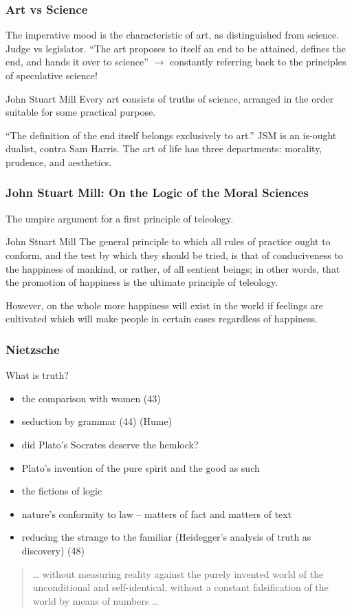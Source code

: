 \documentclass[xcolor=dvipsnames]{beamer}
\begin{document}
\begin{frame}
  \frametitle{Art vs Science}
  The imperative mood is the characteristic of art, as distinguished
  from science. Judge vs legislator. ``The art proposes to itself an
  end to be attained, defines the end, and hands it over to science''
  $\longrightarrow$ constantly referring back to the principles of
  speculative science!
  \begin{block}{John Stuart Mill}
    Every art consists of truths of science, arranged in the order
    suitable for some practical purpose.
  \end{block}
``The definition of the end itself belongs exclusively to art.'' JSM
is an is-ought dualist, contra Sam Harris. The art of life has three
departments: morality, prudence, and aesthetics.
\end{frame}

\begin{frame}
  \frametitle{John Stuart Mill: On the Logic of the Moral Sciences}
  The umpire argument for a first principle of teleology.
  \begin{block}{John Stuart Mill}
    The general principle to which all rules of practice ought to
    conform, and the test by which they should be tried, is that of
    conduciveness to the happiness of mankind, or rather, of all
    sentient beings; in other words, that the promotion of happiness
    is the ultimate principle of teleology.
  \end{block}
However, on the whole more happiness will exist in the world if
feelings are cultivated which will make people in certain cases
regardless of happiness.
\end{frame}

\begin{frame}
  \frametitle{Nietzsche}
  What is truth?
  \begin{itemize}
  \item the comparison with women (43)
  \item seduction by grammar (44) (Hume)
  \item did Plato's Socrates deserve the hemlock?
  \item Plato's invention of the pure spirit and the good as such
  \item the fictions of logic
  \item nature's conformity to law -- matters of fact and matters of
    text
  \item reducing the strange to the familiar (Heidegger's analysis of
    truth as discovery) (48)
  \end{itemize}
  \begin{quote}
    {\ldots} without measuring reality against the purely invented
    world of the unconditional and self-identical, without a constant
    falsification of the world by means of numbers {\ldots}
  \end{quote}
\end{frame}
\end{document}

